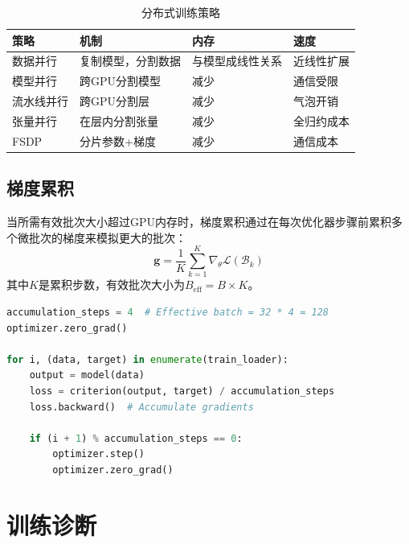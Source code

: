 \begin{table}[ht]
    \centering
    \caption{分布式训练策略}
    \begin{tabular}{L{3cm} L{4cm} L{3cm} L{3cm}}
        \toprule
        \textbf{策略} & \textbf{机制} & \textbf{内存} & \textbf{速度} \\
        \midrule
        数据并行 & 复制模型，分割数据 & 与模型成线性关系 & 近线性扩展 \\
        模型并行 & 跨GPU分割模型 & 减少 & 通信受限 \\
        流水线并行 & 跨GPU分割层 & 减少 & 气泡开销 \\
        张量并行 & 在层内分割张量 & 减少 & 全归约成本 \\
        FSDP & 分片参数+梯度 & 减少 & 通信成本 \\
        \bottomrule
    \end{tabular}
\end{table}

\subsection{梯度累积}

当所需有效批次大小超过GPU内存时，梯度累积通过在每次优化器步骤前累积多个微批次的梯度来模拟更大的批次：
\begin{equation}
\mathbf{g} = \frac{1}{K}\sum_{k=1}^{K} \nabla_\theta \mathcal{L}(\mathcal{B}_k)
\end{equation}
其中$K$是累积步数，有效批次大小为$B_{\text{eff}} = B \times K$。

\begin{code}
    \label{code:grad_accum}
\begin{lstlisting}[language=python]
accumulation_steps = 4  # Effective batch = 32 * 4 = 128
optimizer.zero_grad()

for i, (data, target) in enumerate(train_loader):
    output = model(data)
    loss = criterion(output, target) / accumulation_steps
    loss.backward()  # Accumulate gradients
    
    if (i + 1) % accumulation_steps == 0:
        optimizer.step()
        optimizer.zero_grad()
\end{lstlisting}
\end{code}

\section{训练诊断}

